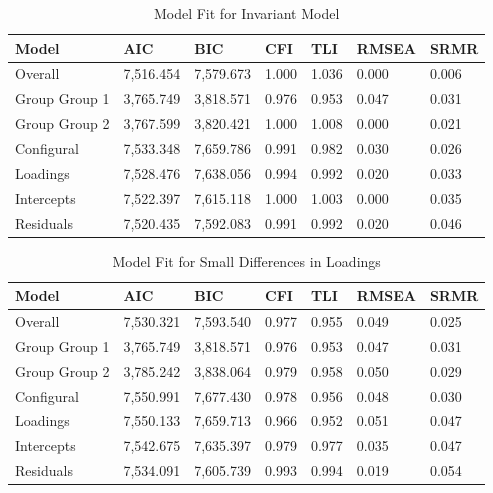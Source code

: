 \documentclass[
  man]{apa7}
\begin{document}
\begin{table}[tbp]

\begin{center}
\begin{threeparttable}

\caption{\label{tab:tab1}Model Fit for Invariant Model}

\begin{tabular}{lllllll}
\toprule
Model & AIC & BIC & CFI & TLI & RMSEA & SRMR\\
\midrule
Overall & 7,516.454 & 7,579.673 & 1.000 & 1.036 & 0.000 & 0.006\\
Group Group 1 & 3,765.749 & 3,818.571 & 0.976 & 0.953 & 0.047 & 0.031\\
Group Group 2 & 3,767.599 & 3,820.421 & 1.000 & 1.008 & 0.000 & 0.021\\
Configural & 7,533.348 & 7,659.786 & 0.991 & 0.982 & 0.030 & 0.026\\
Loadings & 7,528.476 & 7,638.056 & 0.994 & 0.992 & 0.020 & 0.033\\
Intercepts & 7,522.397 & 7,615.118 & 1.000 & 1.003 & 0.000 & 0.035\\
Residuals & 7,520.435 & 7,592.083 & 0.991 & 0.992 & 0.020 & 0.046\\
\bottomrule
\end{tabular}

\end{threeparttable}
\end{center}

\end{table}

\begin{table}[tbp]

\begin{center}
\begin{threeparttable}

\caption{\label{tab:tab2}Model Fit for Small Differences in Loadings}

\begin{tabular}{lllllll}
\toprule
Model & AIC & BIC & CFI & TLI & RMSEA & SRMR\\
\midrule
Overall & 7,530.321 & 7,593.540 & 0.977 & 0.955 & 0.049 & 0.025\\
Group Group 1 & 3,765.749 & 3,818.571 & 0.976 & 0.953 & 0.047 & 0.031\\
Group Group 2 & 3,785.242 & 3,838.064 & 0.979 & 0.958 & 0.050 & 0.029\\
Configural & 7,550.991 & 7,677.430 & 0.978 & 0.956 & 0.048 & 0.030\\
Loadings & 7,550.133 & 7,659.713 & 0.966 & 0.952 & 0.051 & 0.047\\
Intercepts & 7,542.675 & 7,635.397 & 0.979 & 0.977 & 0.035 & 0.047\\
Residuals & 7,534.091 & 7,605.739 & 0.993 & 0.994 & 0.019 & 0.054\\
\bottomrule
\end{tabular}

\end{threeparttable}
\end{center}

\end{table}
\end{document}
